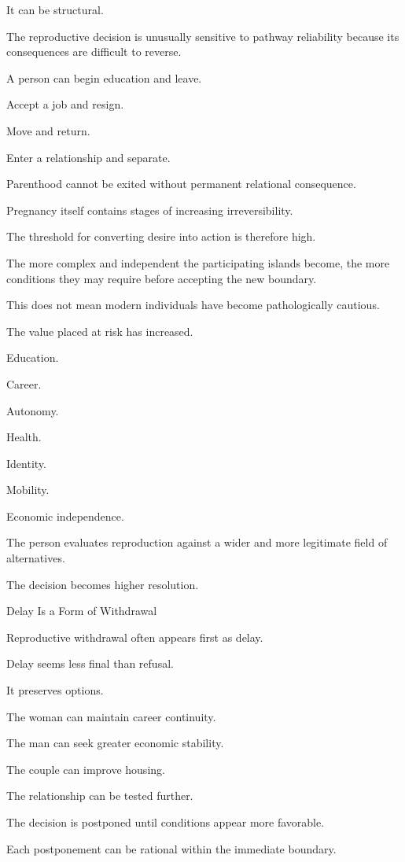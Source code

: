 It can be structural.

The reproductive decision is unusually sensitive to pathway reliability because its consequences are difficult to reverse.

A person can begin education and leave.

Accept a job and resign.

Move and return.

Enter a relationship and separate.

Parenthood cannot be exited without permanent relational consequence.

Pregnancy itself contains stages of increasing irreversibility.

The threshold for converting desire into action is therefore high.

The more complex and independent the participating islands become, the more conditions they may require before accepting the new boundary.

This does not mean modern individuals have become pathologically cautious.

The value placed at risk has increased.

Education.

Career.

Autonomy.

Health.

Identity.

Mobility.

Economic independence.

The person evaluates reproduction against a wider and more legitimate field of alternatives.

The decision becomes higher resolution.

Delay Is a Form of Withdrawal

Reproductive withdrawal often appears first as delay.

Delay seems less final than refusal.

It preserves options.

The woman can maintain career continuity.

The man can seek greater economic stability.

The couple can improve housing.

The relationship can be tested further.

The decision is postponed until conditions appear more favorable.

Each postponement can be rational within the immediate boundary.

